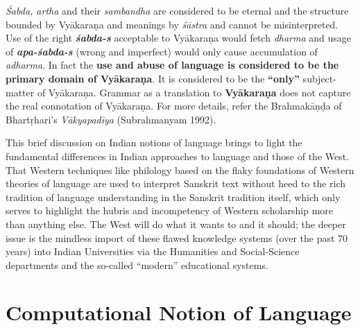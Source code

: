 \textit{Śabda, artha} and their \textit{sambandha} are considered to be eternal and the structure bounded by Vyākaraṇa and meanings by \textit{śāstra} and cannot be misinterpreted. Use of the right \textbf{\textit{śabda-s}} acceptable to Vyākaraṇa would fetch \textit{dharma} and usage of \textbf{\textit{apa-śabda-s}} (wrong and imperfect) would only cause accumulation of \textit{adharma}. In fact the \textbf{use and abuse of language is considered to be the primary domain of Vyākaraṇa}. It is considered to be the \textbf{“only”} subject-matter of Vyākaraṇa. Grammar as a translation to \textbf{Vyākaraṇa} does not capture the real connotation of Vyākaraṇa. For more details, refer the Brahmakāṇḍa of Bhartṛhari’s \textit{Vākyapadīya} (Subrahmanyam 1992).

This brief discussion on Indian notions of language brings to light the fundamental differences in Indian approaches to language and those of the West. That Western techniques like philology based on the flaky foundations of Western theories of language are used to interpret Sanskrit text without heed to the rich tradition of language understanding in the Sanskrit tradition itself, which only serves to highlight the hubris and incompetency of Western scholarship more than anything else. The West will do what it wants to and it should; the deeper issue is the mindless import of these flawed knowledge systems (over the past 70 years) into Indian Universities via the Humanities and Social-Science departments and the so-called “modern” educational systems.


\section*{Computational Notion of Language}

